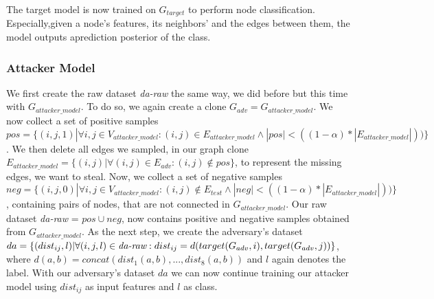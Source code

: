         The target model is now trained on $G_{target}$ to perform node classification.
        Especially,given a node’s features, its neighbors’ and the edges between them, the model outputs aprediction posterior of the class.

      \subsubsection{Attacker Model}

        We first create the raw dataset \emph{da-raw} the same way, we did before but this time with $G_{attacker\_model}$.
        To do so, we again create a clone $G_{adv} = G_{attacker\_model}$.
        We now collect a set of positive samples $pos = \{(i,j, 1) | \forall i,j \in V_{attacker\_model}: (i,j) \in E_{attacker\_model} \wedge |pos| < ((1 - \alpha) * |E_{attacker\_model}|))\}$.
        We then delete all edges we sampled, in our graph clone $E_{attacker\_model} = \{(i,j) | \forall (i,j) \in E_{adv}: (i,j) \not\in pos\}$, to represent the missing edges, we want to steal.
        Now, we collect a set of negative samples $neg = \{(i,j, 0) | \forall i,j \in V_{attacker\_model}: (i,j) \not\in E_{test} \wedge |neg| < ((1 - \alpha) * |E_{attacker\_model}|))\}$, containing pairs of nodes, that are not connected in $G_{attacker\_model}$.
        Our raw dataset \emph{da-raw} = $pos \cup neg$, now contains positive and negative samples obtained from $G_{attacker\_model}$.
        As the next step, we create the adversary's dataset $da = \{(dist_{ij}, l) | \forall (i,j,l)\in\emph{da-raw}: dist_{ij} = d(target(G_{adv}, i), target(G_{adv}, j))\}$, where $d(a,b) = concat(dist_1(a,b), ..., dist_8(a,b))$ and $l$ again denotes the label.
        With our adversary's dataset $da$ we can now continue training our attacker model using $dist_{ij}$ as input features and $l$ as class.



